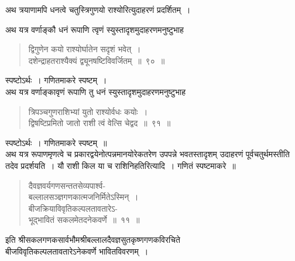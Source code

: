 \documentclass[11pt, openany]{book}
\begin{document}
\vspace{-3mm}
 अथ त्रयाणामपि धनत्वे चतुस्त्रिगुणयो राश्योरित्युदाहरणं प्रदर्शितम्~।
\newpage

अथ यत्र वर्णाङ्कौ धनं रूपाणि त्वृणं स्युस्तादृशमुदाहरणमनुष्टुभाह\textendash 
\begin{quote}
    \ex
    द्विगुणेन कयो राश्योर्घातेन सदृशं भवेत्~। \\
 दशेन्द्राहतराश्यैक्यं द्व्यूनषष्टिविवर्जितम्~॥~९०~॥~
\end{quote} 

स्पष्टोऽर्थः~। गणितमाकरे स्पष्टम्~। \\

\vspace{-3mm}
 अथ यत्र वर्णाङ्कावृणं रूपाणि तु धनं स्युस्तादृशमुदाहरणमनुष्टुभाह\textendash 
\begin{quote}
    \ex
     त्रिपञ्चगुणराशिभ्यां युतो राश्योर्वधः कयोः~। \\
 द्विषष्टिप्रमितो जातो राशी त्वं वेत्सि चेद्वद~॥~९१~॥~
\end{quote}

स्पष्टोऽर्थः~। गणितमाकरे स्पष्टम्~॥ \\

\vspace{-3mm}
 अथ यत्र रूपाणमृणत्वे च प्रकारद्वयेनोत्पन्नमानयोरेकतरेण उपपन्ने 
भवतस्तादृशम् उदाहरणं पूर्वचतुर्थमस्तीति तदेव प्रदर्शयति~। यौ राशी किल या च
राशिनिहतिरित्यादि~। गणितं स्पष्टमाकरे~॥ 
\begin{quote}
    \qt
      दैवज्ञवर्यगणसन्ततसेव्यपार्श्व- \\

\vspace{-7mm}
\hspace{1cm} बल्लालसञ्ज्ञगणकात्मजनिर्मितेऽस्मिन्~। \\

\vspace{-7mm}
 बीजक्रियाविवृतिकल्पलतावतारेऽ- \\

\vspace{-7mm}
\hspace{1cm} भूद्भावितं सकलमेतदनेकवर्णे~॥~११~॥~
\end{quote}

\begin{center}
     इति श्रीसकलगणकसार्वभौमश्रीबल्लालदैवज्ञसुतकृष्णगणकविरचिते \\  बीजविवृतिकल्पलतावतारेऽनेकवर्णे भावितविवरणम्~। 
\end{center}
\end{document}
